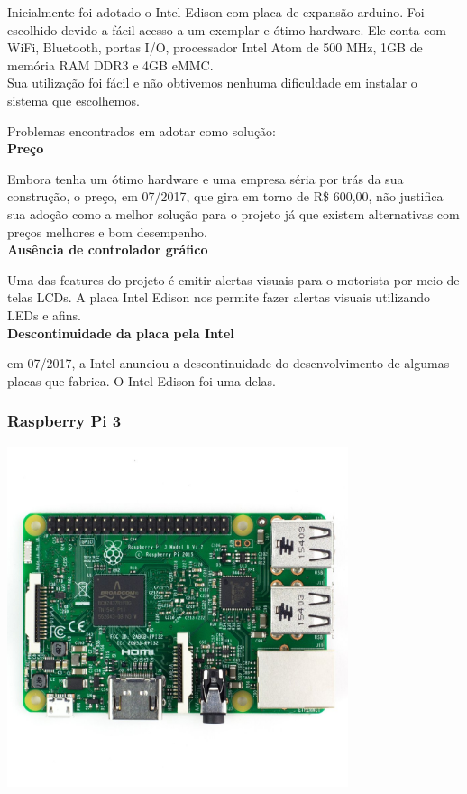 \documentclass[a4paper, 12pt]{article}
\begin{document}
Inicialmente foi adotado o Intel Edison com placa de expansão arduino. Foi escolhido devido a fácil acesso a um exemplar e ótimo hardware. Ele conta com WiFi, Bluetooth, portas I/O, processador Intel Atom de 500 MHz, 1GB de memória RAM DDR3 e 4GB eMMC. \\
Sua utilização foi fácil e não obtivemos nenhuma dificuldade em instalar o sistema que escolhemos.


Problemas encontrados em adotar como solução:
\\

\textbf{Preço}

Embora tenha um ótimo hardware e uma empresa séria por trás da sua construção, o preço, em 07/2017, que gira em torno de R\$ 600,00, não justifica sua adoção como a melhor solução para o projeto já que existem alternativas com preços melhores e bom desempenho.
\\

\textbf{Ausência de controlador gráfico}

Uma das features do projeto é emitir alertas visuais para o motorista por meio de telas LCDs. A placa Intel Edison nos permite fazer alertas visuais utilizando LEDs e afins. 
\\

\textbf{Descontinuidade da placa pela Intel}

em 07/2017, a Intel anunciou a descontinuidade do desenvolvimento de algumas placas que fabrica. O Intel Edison foi uma delas.

\subsubsection{Raspberry Pi 3}

\includegraphics[width=10cm, center]{images/raspberry-pi}
\end{document}
